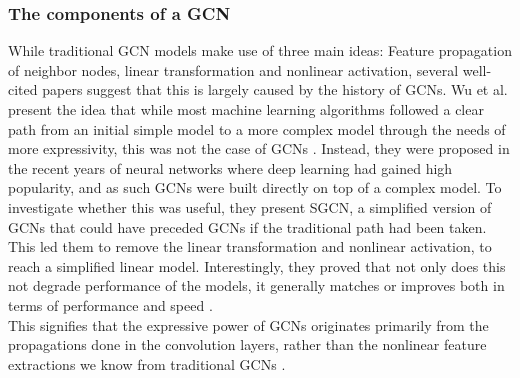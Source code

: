 \subsubsection*{The components of a GCN}
While traditional GCN models make use of three main ideas: Feature propagation of neighbor nodes, linear transformation and nonlinear activation, several well-cited papers \cite{SimplifyingGCN,LightGCN,HeteGCN} suggest that this is largely caused by the history of GCNs.
Wu et al. present the idea that while most machine learning algorithms followed a clear path from an initial simple model to a more complex model through the needs of more expressivity, this was not the case of GCNs \cite{SimplifyingGCN}.
Instead, they were proposed in the recent years of neural networks where deep learning had gained high popularity, and as such GCNs were built directly on top of a complex model.
To investigate whether this was useful, they present SGCN, a simplified version of GCNs that could have preceded GCNs if the traditional path had been taken.
This led them to remove the linear transformation and nonlinear activation, to reach a simplified linear model.
Interestingly, they proved that not only does this not degrade performance of the models, it generally matches or improves both in terms of performance and speed \cite{SimplifyingGCN}.\\
This signifies that the expressive power of GCNs originates primarily from the propagations done in the convolution layers, rather than the nonlinear feature extractions we know from traditional GCNs \cite{SimplifyingGCN}.

